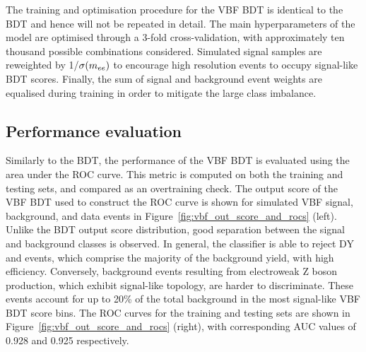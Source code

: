 The training and optimisation procedure for the VBF BDT is identical to the \ggH BDT and hence will not be repeated in detail. The main hyperparameters of the model are optimised through a 3-fold cross-validation, with approximately ten thousand possible combinations considered. Simulated signal samples are reweighted by 1/$\sigma(m_{ee})$ to encourage high resolution events to occupy signal-like BDT scores. Finally, the sum of signal and background event weights are equalised during training in order to mitigate the large class imbalance.

\subsection{Performance evaluation}

Similarly to the \ggH BDT, the performance of the VBF BDT is evaluated using the area under the ROC curve. This metric is computed on both the training and testing sets, and compared as an overtraining check.
The output score of the VBF BDT used to construct the ROC curve is shown for simulated VBF signal, background, and data events in Figure~\ref{fig:vbf_out_score_and_rocs} (left). Unlike the \ggH BDT output score distribution, good separation between the signal and background classes is observed. In general, the classifier is able to reject DY and \ttbar events, which comprise the majority of the background yield, with high efficiency. Conversely, background events resulting from electroweak $\mathrm{Z}$ boson production, which exhibit signal-like topology, are harder to discriminate. These events account for up to 20\% of the total background in the most signal-like VBF BDT score bins.
The ROC curves for the training and testing sets are shown in Figure~\ref{fig:vbf_out_score_and_rocs} (right), with corresponding AUC values of 0.928 and 0.925 respectively.

